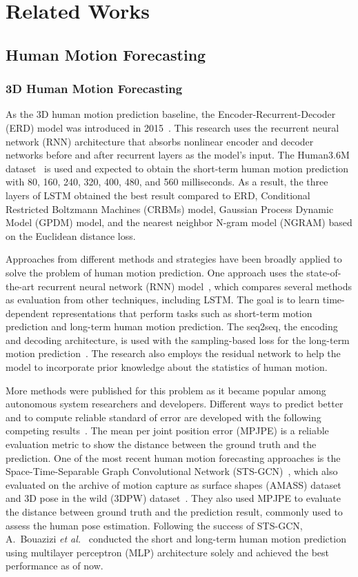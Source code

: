 \section{Related Works}
\subsection{Human Motion Forecasting}
\subsubsection{3D Human Motion Forecasting}
As the 3D human motion prediction baseline, the Encoder-Recurrent-Decoder (ERD) model was introduced in 2015~\cite{fragkiadaki2015recurrent}. This research uses the recurrent neural network (RNN) architecture that absorbs nonlinear encoder and decoder networks before and after recurrent layers as the model's input. The Human3.6M dataset~\cite{human3.6m} is used and expected to obtain the short-term human motion prediction with 80, 160, 240, 320, 400, 480, and 560 milliseconds. As a result, the three layers of LSTM obtained the best result compared to ERD, Conditional Restricted Boltzmann Machines (CRBMs) model, Gaussian Process Dynamic Model (GPDM) model, and the nearest neighbor N-gram model (NGRAM) based on the Euclidean distance loss. 

Approaches from different methods and strategies have been broadly applied to solve the problem of human motion prediction.
One approach uses the state-of-the-art recurrent neural network (RNN) model~\cite{martinez2017}, which compares several methods as evaluation from other techniques, including LSTM. The goal is to learn time-dependent representations that perform tasks such as short-term motion prediction and long-term human motion prediction.
The seq2seq, the encoding and decoding architecture, is used with the sampling-based loss for the long-term motion prediction~\cite{sutskever2014}. The research also employs the residual network to help the model to incorporate prior knowledge about the statistics of human motion.

More methods were published for this problem as it became popular among autonomous system researchers and developers. Different ways to predict better and to compute reliable standard of error are developed with the following competing results~\cite{jain2016, wang2019, chiu2019, Mao2019}. The mean per joint position error (MPJPE) is a reliable evaluation metric to show the distance between the ground truth and the prediction. One of the most recent human motion forecasting approaches is the Space-Time-Separable Graph Convolutional Network (STS-GCN)~\cite{Sofianos2021}, which also evaluated on the archive of motion capture as surface shapes (AMASS) dataset~\cite{AMASS2019} and 3D pose in the wild (3DPW) dataset~\cite{vonMarcard2018}. They also used MPJPE to evaluate the distance between ground truth and the prediction result, commonly used to assess the human pose estimation.
Following the success of STS-GCN, A.~Bouazizi {\it et al.}~\cite{motionmixer2022} conducted the short and long-term human motion prediction using multilayer perceptron (MLP) architecture solely and achieved the best performance as of now. 

